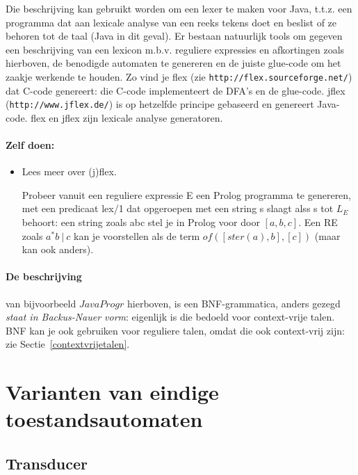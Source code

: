 \label{flexlabel}Die beschrijving kan gebruikt worden om een lexer te
maken voor Java, t.t.z. een programma dat aan lexicale analyse van een
reeks tekens doet en beslist of ze behoren tot de taal (Java in dit
geval). Er bestaan natuurlijk tools om gegeven een beschrijving
van een lexicon m.b.v. reguliere expressies en afkortingen zoals
hierboven, de benodigde automaten te genereren en de juiste glue-code
om het zaakje werkende te houden. Zo vind je flex (zie
\verb|http://flex.sourceforge.net/|) dat C-code genereert: die C-code
implementeert de DFA's en de glue-code. jflex
(\verb|http://www.jflex.de/|) is op hetzelfde principe gebaseerd en
genereert Java-code. flex en jflex zijn lexicale analyse generatoren.

\paragraph{Zelf doen:}
\begin{itemize}
\item[]
Lees meer over (j)flex.

Probeer vanuit een reguliere expressie E een Prolog programma te
genereren, met een predicaat lex/1 dat opgeroepen met een string s
slaagt alss s tot $L_E$ behoort: een string zoals abc stel je in
Prolog voor door $[a,b,c]$. Een RE zoals $a^*b~|~c$ kan je voorstellen
als de term $of([ster(a),b],[c])$ (maar kan ook anders).
\end{itemize}

\paragraph{De beschrijving} van bijvoorbeeld $JavaProgr$ hierboven, is
een BNF-grammatica, anders gezegd {\em staat in Backus-Nauer vorm}:
eigenlijk is die bedoeld voor context-vrije talen. BNF kan je ook
gebruiken voor reguliere talen, omdat die ook context-vrij zijn: zie
Sectie~\ref{contextvrijetalen}.

\newpage 
\section{Varianten van eindige toestandsautomaten}

\subsection{Transducer}



